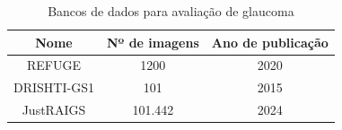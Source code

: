 \documentclass[12pt]{article}
\begin{document}

\begin{table}[htb]
    \centering
    \begin{tabular}{|c|c|c|}
    \hline
    Nome & Nº de imagens & Ano de publicação \\
    \hline
    REFUGE & 1200 & 2020 \\
    \hline
    DRISHTI-GS1 & 101 & 2015 \\
    \hline
    JustRAIGS & 101.442 & 2024 \\
    \hline
    \end{tabular}
    \caption{Bancos de dados para avaliação de glaucoma}
    \label{tab:datasets}
\end{table}
\end{document}
